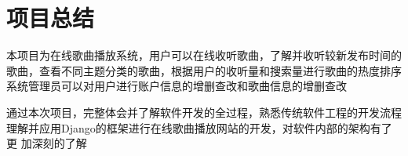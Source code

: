 \documentclass[UTF8,14pt]{article}
\numberwithin{figure}{subsubsection}
\numberwithin{table}{subsubsection}
\begin{document}
\section{项目总结}
本项目为在线歌曲播放系统，用户可以在线收听歌曲，了解并收听较新发布时间的
歌曲，查看不同主题分类的歌曲，根据用户的收听量和搜索量进行歌曲的热度排序
系统管理员可以对用户进行账户信息的增删查改和歌曲信息的增删查改

通过本次项目，完整体会并了解软件开发的全过程，熟悉传统软件工程的开发流程
理解并应用Django的框架进行在线歌曲播放网站的开发，对软件内部的架构有了更
加深刻的了解
\end{document}
